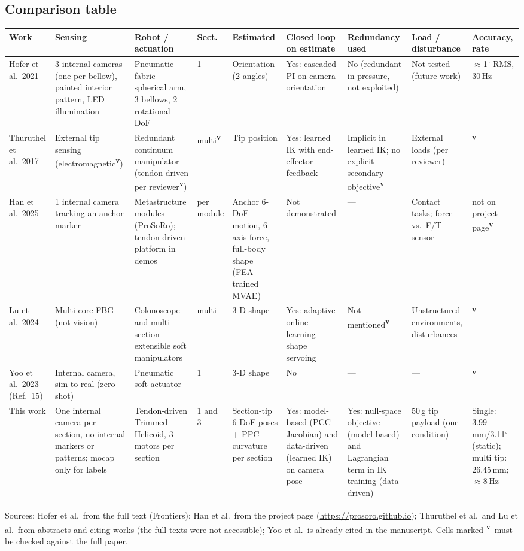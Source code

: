 \documentclass[10pt,a4paper]{article}
\newcommand{\vf}{\textsuperscript{\textcolor{orange!85!black}{\textbf{v}}}}
\begin{document}
\subsection{Comparison table}
\scriptsize
\begin{longtable}{p{1.6cm}p{2.3cm}p{2.0cm}p{0.9cm}p{2.2cm}p{2.0cm}p{1.7cm}p{1.5cm}p{1.6cm}}
\toprule
Work & Sensing & Robot / actuation & Sect. & Estimated & Closed loop on estimate & Redundancy used & Load / disturbance & Accuracy, rate\\\midrule\endhead
Hofer et al.\ 2021 & 3 internal cameras (one per bellow), painted interior pattern, LED illumination & Pneumatic fabric spherical arm, 3 bellows, 2 rotational DoF & 1 & Orientation (2 angles) & Yes: cascaded PI on camera orientation & No (redundant in pressure, not exploited) & Not tested (future work) & $\approx$1$^\circ$ RMS, 30\,Hz\\
Thuruthel et al.\ 2017 & External tip sensing (electromagnetic\vf) & Redundant continuum manipulator (tendon-driven per reviewer\vf) & multi\vf & Tip position & Yes: learned IK with end-effector feedback & Implicit in learned IK; no explicit secondary objective\vf & External loads (per reviewer) & \vf\\
Han et al.\ 2025 & 1 internal camera tracking an anchor marker & Metastructure modules (ProSoRo); tendon-driven platform in demos & per module & Anchor 6-DoF motion, 6-axis force, full-body shape (FEA-trained MVAE) & Not demonstrated & --- & Contact tasks; force vs.\ F/T sensor & not on project page\vf\\
Lu et al.\ 2024 & Multi-core FBG (not vision) & Colonoscope and multi-section extensible soft manipulators & multi & 3-D shape & Yes: adaptive online-learning shape servoing & Not mentioned\vf & Unstructured environments, disturbances & \vf\\
Yoo et al.\ 2023 (Ref.~15) & Internal camera, sim-to-real (zero-shot) & Pneumatic soft actuator & 1 & 3-D shape & No & --- & --- & \vf\\
\rowcolor{blue!6}This work & One internal camera per section, no internal markers or patterns; mocap only for labels & Tendon-driven Trimmed Helicoid, 3 motors per section & 1 and 3 & Section-tip 6-DoF poses + PPC curvature per section & Yes: model-based (PCC Jacobian) and data-driven (learned IK) on camera pose & Yes: null-space objective (model-based) and Lagrangian term in IK training (data-driven) & 50\,g tip payload (one condition) & Single: 3.99\,mm/3.11$^\circ$ (static); multi tip: 26.45\,mm; $\approx$8\,Hz\\
\bottomrule
\end{longtable}
\normalsize
Sources: Hofer et al.\ from the full text (Frontiers); Han et al.\ from the project page (\url{https://prosoro.github.io}); Thuruthel et al.\ and Lu et al.\ from abstracts and citing works (the full texts were not accessible); Yoo et al.\ is already cited in the manuscript. Cells marked \vf\ must be checked against the full paper.
\end{document}
